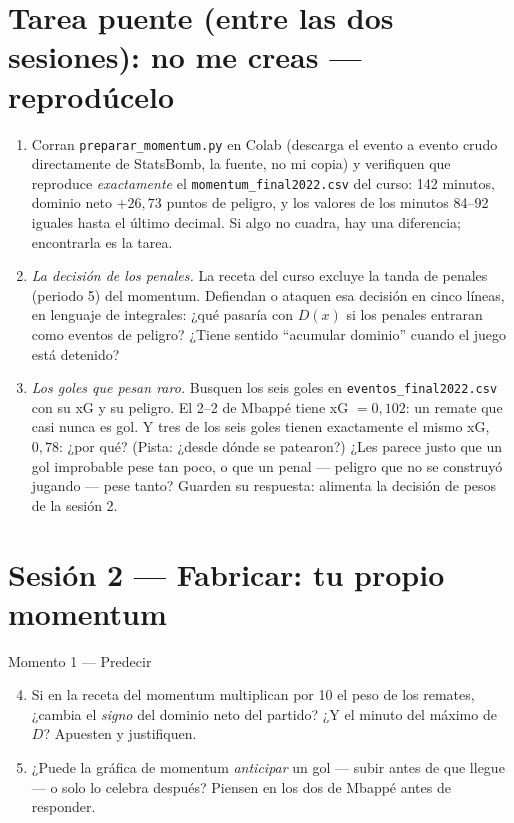 \documentclass[12pt,letterpaper]{article}
\begin{document}
\section{Tarea puente (entre las dos sesiones): no me creas --- reprodúcelo}
\begin{enumerate}[label=\arabic*., itemsep=0.15em]
    \item Corran \texttt{preparar\_momentum.py} en Colab (descarga el evento a evento crudo directamente de StatsBomb, la fuente, no mi copia) y verifiquen que reproduce \emph{exactamente} el \texttt{momentum\_final2022.csv} del curso: 142 minutos, dominio neto $+26{,}73$ puntos de peligro, y los valores de los minutos 84--92 iguales hasta el último decimal. Si algo no cuadra, hay una diferencia; encontrarla es la tarea.
    \item \emph{La decisión de los penales.} La receta del curso excluye la tanda de penales (periodo 5) del momentum. Defiendan o ataquen esa decisión en cinco líneas, en lenguaje de integrales: ¿qué pasaría con $D(x)$ si los penales entraran como eventos de peligro? ¿Tiene sentido ``acumular dominio'' cuando el juego está detenido?
    \item \emph{Los goles que pesan raro.} Busquen los seis goles en \texttt{eventos\_final2022.csv} con su xG y su peligro. El 2--2 de Mbappé tiene xG $=0{,}102$: un remate que casi nunca es gol. Y tres de los seis goles tienen exactamente el mismo xG, $0{,}78$: ¿por qué? (Pista: ¿desde dónde se patearon?) ¿Les parece justo que un gol improbable pese tan poco, o que un penal --- peligro que no se construyó jugando --- pese tanto? Guarden su respuesta: alimenta la decisión de pesos de la sesión 2.
\end{enumerate}

\section{Sesión 2 --- Fabricar: tu propio momentum}

\begin{cajaprediccion}{Momento 1 --- Predecir}
\begin{enumerate}[label=P\arabic*., itemsep=0.1em]
    \setcounter{enumi}{3}
    \item Si en la receta del momentum multiplican por 10 el peso de los remates, ¿cambia el \emph{signo} del dominio neto del partido? ¿Y el minuto del máximo de $D$? Apuesten y justifiquen.
    \item ¿Puede la gráfica de momentum \emph{anticipar} un gol --- subir antes de que llegue --- o solo lo celebra después? Piensen en los dos de Mbappé antes de responder.
\end{enumerate}
\end{cajaprediccion}
\end{document}
